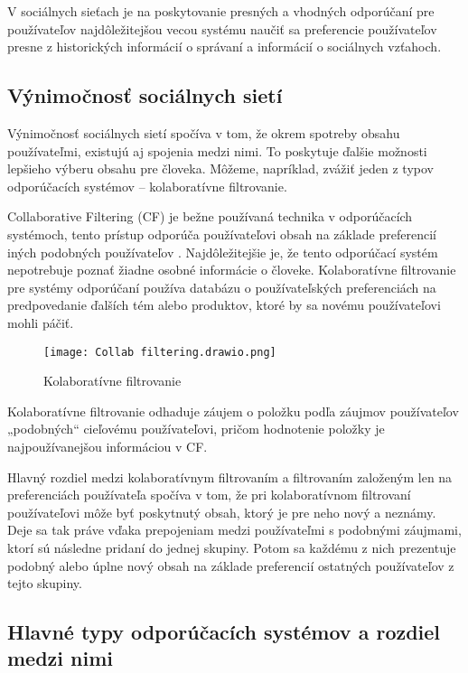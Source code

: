 \documentclass[10pt,twoside,slovak,a4paper]{article}
\begin{document}
V sociálnych sieťach je na poskytovanie presných a vhodných odporúčaní pre používateľov najdôležitejšou vecou systému naučiť sa preferencie používateľov presne z historických informácií o správaní a informácií o sociálnych vzťahoch\cite{li_social_network08}.





\subsection{Výnimočnosť sociálnych sietí}

Výnimočnosť sociálnych sietí spočíva v tom, že okrem spotreby obsahu používateľmi, existujú aj spojenia medzi nimi. To poskytuje ďalšie možnosti lepšieho výberu obsahu pre človeka. Môžeme, napríklad, zvážiť jeden z typov odporúčacích systémov – kolaboratívne filtrovanie.

Collaborative Filtering (CF) je bežne používaná technika v odporúčacích systémoch, tento prístup odporúča používateľovi obsah na základe preferencií iných podobných používateľov \cite{dang03}. Najdôležitejšie je, že tento odporúčací systém nepotrebuje poznať žiadne osobné informácie o človeke. Kolaboratívne filtrovanie pre systémy odporúčaní používa databázu o používateľských preferenciách na predpovedanie ďalších tém alebo produktov, ktoré by sa novému používateľovi mohli páčiť\cite{john_cf06}.



\begin{figure}[h]
    \centering
    \texttt{[image: Collab filtering.drawio.png]}
    \caption{Kolaboratívne filtrovanie}
    \label{fig:collab filtering}
\end{figure}


Kolaboratívne filtrovanie odhaduje záujem o položku podľa záujmov používateľov „podobných“ cieľovému používateľovi, pričom hodnotenie položky je najpoužívanejšou informáciou v CF\cite{diego01}.

Hlavný rozdiel medzi kolaboratívnym filtrovaním a filtrovaním založeným len na preferenciách používateľa spočíva v tom, že pri kolaboratívnom filtrovaní používateľovi môže byť poskytnutý obsah, ktorý je pre neho nový a neznámy. Deje sa tak práve vďaka prepojeniam medzi používateľmi s podobnými záujmami, ktorí sú následne pridaní do jednej skupiny. Potom sa každému z nich prezentuje podobný alebo úplne nový obsah na základe preferencií ostatných používateľov z tejto skupiny.


\subsection{Hlavné typy odporúčacích systémov a rozdiel medzi nimi}
\end{document}
